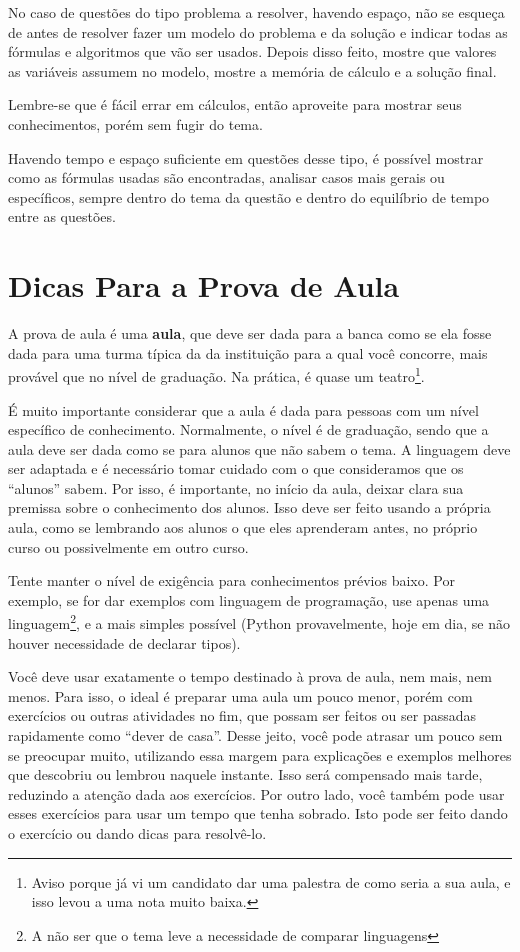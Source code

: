 \documentclass{article}
\begin{document}
No caso de questões do tipo problema a resolver, havendo espaço, não se esqueça de antes de resolver fazer um modelo do problema e da solução e indicar todas as fórmulas e algoritmos que vão ser usados.
Depois disso feito, mostre que valores as variáveis assumem no modelo, mostre a memória de cálculo e a solução final.

Lembre-se que é fácil errar em cálculos, então aproveite para mostrar seus conhecimentos, porém sem fugir do tema.

Havendo tempo e espaço suficiente em questões desse tipo, é possível mostrar como as fórmulas usadas são encontradas, analisar casos mais gerais ou específicos, sempre dentro do tema da questão e dentro do equilíbrio de tempo entre as questões.

\section{Dicas Para a Prova de Aula}

A prova de aula é uma \textbf{aula}, que deve ser dada para a banca como se ela fosse dada para uma turma típica da  da instituição para a qual você concorre, mais provável que no nível de graduação. Na prática, é quase um teatro\footnote{Aviso porque já vi um candidato dar uma palestra de como seria a sua aula, e isso levou a uma nota muito baixa.}.

É muito importante considerar que  a aula é dada para pessoas com um nível específico de conhecimento. Normalmente, o nível é de graduação, sendo que a aula deve ser dada como se para alunos que não sabem o tema. A linguagem deve ser adaptada e é necessário tomar cuidado com o que consideramos que os ``alunos'' sabem. Por isso, é importante, no início da aula, deixar clara sua premissa sobre o conhecimento dos alunos. Isso deve ser feito usando a própria aula, como se lembrando aos alunos o que eles aprenderam antes, no próprio curso ou possivelmente em outro curso.

Tente manter o nível de exigência para conhecimentos prévios baixo. Por exemplo, se for dar exemplos com linguagem de programação, use apenas uma linguagem\footnote{A não ser que o tema leve a necessidade de comparar linguagens}, e a mais simples possível (Python provavelmente, hoje em dia, se não houver necessidade de declarar tipos).

Você deve usar exatamente o tempo destinado à prova de aula, nem mais, nem menos. Para isso, o ideal é preparar uma aula um pouco menor, porém com exercícios ou outras atividades no fim, que possam ser feitos ou ser passadas rapidamente como ``dever de casa''.
Desse jeito, você pode atrasar um pouco sem se preocupar muito, utilizando essa margem para explicações e exemplos melhores que descobriu ou lembrou naquele instante. Isso será compensado mais tarde, reduzindo a atenção dada aos exercícios.
Por outro lado, você também pode usar esses exercícios para usar um tempo que tenha sobrado. Isto pode ser feito dando o exercício ou dando dicas para resolvê-lo.
\end{document}
